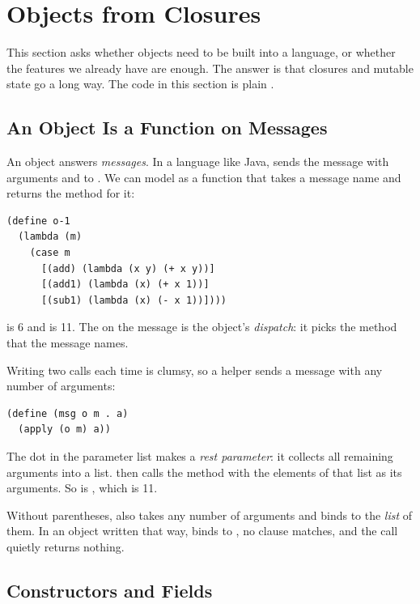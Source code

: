 \section{Objects from Closures}
\label{sec:objects}

This section asks whether objects need to be built into a language, or whether the features we already have are enough. The answer is that closures and mutable state go a long way. The code in this section is plain .

\subsection{An Object Is a Function on Messages}

An object answers \emph{messages}. In a language like Java,  sends the message  with arguments  and  to . We can model  as a function that takes a message name and returns the method for it:
\begin{lstlisting}
(define o-1
  (lambda (m)
    (case m
      [(add) (lambda (x y) (+ x y))]
      [(add1) (lambda (x) (+ x 1))]
      [(sub1) (lambda (x) (- x 1))])))
\end{lstlisting}
 is 6 and  is 11. The  on the message is the object's \emph{dispatch}: it picks the method that the message names.

Writing two calls each time is clumsy, so a helper sends a message with any number of arguments:
\begin{lstlisting}
(define (msg o m . a)
  (apply (o m) a))
\end{lstlisting}
The dot in the parameter list makes  a \emph{rest parameter}: it collects all remaining arguments into a list.  then calls the method with the elements of that list as its arguments. So  is , which is 11.

\begin{pitfall}
Without parentheses,  also takes any number of arguments and binds  to the \emph{list} of them. In an object written that way,  binds  to , no  clause matches, and the call quietly returns nothing.
\end{pitfall}

\subsection{Constructors and Fields}

